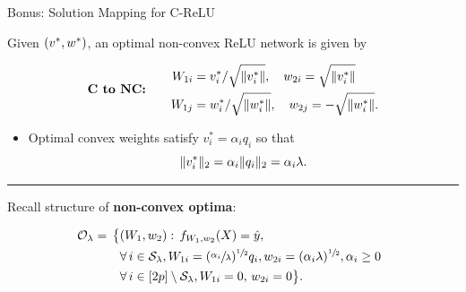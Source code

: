 \documentclass[usenames,dvipsnames,mathserif,notheorems]{beamer}
\newcommand{\horizontalrule}{
	{
			\vspace{-0.5em}
			\center \rule{\textwidth}{0.1em}
			\vspace{-0.2em}
		}
}
\begin{document}
\begin{frame}{Bonus: Solution Mapping for C-ReLU}

	Given \( \left(v^*, w^*\right) \), an optimal non-convex ReLU network is given by

	\begin{equation*}
		\textbf{C to NC:} \quad \quad
		\begin{aligned}
			W_{1i} & = v_i^*/ \sqrt{\|v_i^*\|}, \quad w_{2i} = \sqrt{\|v_i^*\|}
			\\
			W_{1j} & = w_i^*/ \sqrt{\|w_i^*\|}, \quad w_{2j} = -\sqrt{\|w_i^*\|}.
		\end{aligned}
	\end{equation*}

	\pause
	\vspace{3ex}
	\begin{itemize}
		\item Optimal convex weights satisfy \( v_i^* = \alpha_i q_i \)
		      so that
		      \[
			      \|v_i^*\|_2 = \alpha_i \|q_i\|_2 = \alpha_i \lambda.
		      \]
	\end{itemize}

	\pause
	\horizontalrule

	Recall structure of \textbf{non-convex optima}:

	\begin{equation*}
		\begin{aligned}
			\hspace{-0.5em} \mathcal{O}_\lambda  = \,
			\big\{
			 & (W_1,  w_2) :
			\, f_{W_1, w_2}(X)  =  \hat y,                       \\
			 & \forall \, {i}  \in  \mathcal{S}_\lambda,
			W_{1i} = (\sfrac{\alpha_{i}}{\lambda})^{\sfrac{1}{2}} q_i,
			w_{2i} = (\alpha_i \lambda)^{\sfrac{1}{2}},
			\alpha_i \geq 0                                      \\
			 & \forall \, {i}  \in [2p] \setminus \mathcal{S}_\lambda,
			W_{1i} = 0, \, w_{2i} = 0
			\big\}.
		\end{aligned}
	\end{equation*}

\end{frame}
\end{document}
